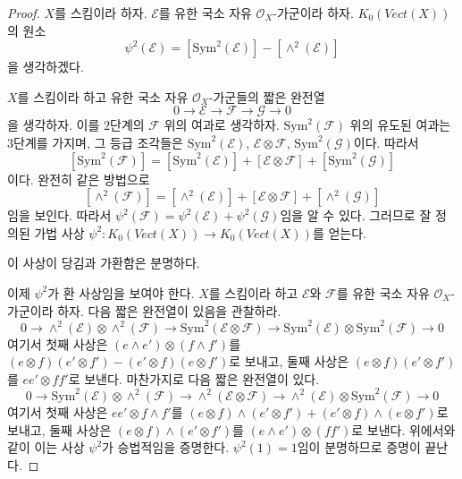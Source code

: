 \begin{proof}
$X$를 스킴이라 하자. $\mathcal{E}$를 유한 국소 자유
$\mathcal{O}_X$-가군이라 하자. $K_0(\textit{Vect}(X))$의 원소
$$
\psi^2(\mathcal{E}) = [\text{Sym}^2(\mathcal{E})] - [\wedge^2(\mathcal{E})]
$$
을 생각하겠다.

\medskip\noindent
$X$를 스킴이라 하고 유한 국소 자유 $\mathcal{O}_X$-가군들의 짧은
완전열
$$
0 \to \mathcal{E} \to \mathcal{F} \to \mathcal{G} \to 0
$$
을 생각하자. 이를 $2$단계의 $\mathcal{F}$ 위의 여과로 생각하자.
$\text{Sym}^2(\mathcal{F})$ 위의 유도된 여과는 $3$단계를 가지며, 그
등급 조각들은 $\text{Sym}^2(\mathcal{E})$,
$\mathcal{E} \otimes \mathcal{F}$,
$\text{Sym}^2(\mathcal{G})$이다. 따라서
$$
[\text{Sym}^2(\mathcal{F})] =
[\text{Sym}^2(\mathcal{E})] +
[\mathcal{E} \otimes \mathcal{F}] +
[\text{Sym}^2(\mathcal{G})]
$$
이다. 완전히 같은 방법으로
$$
[\wedge^2(\mathcal{F})] =
[\wedge^2(\mathcal{E})] +
[\mathcal{E} \otimes \mathcal{F}] +
[\wedge^2(\mathcal{G})]
$$
임을 보인다. 따라서
$\psi^2(\mathcal{F}) = \psi^2(\mathcal{E}) + \psi^2(\mathcal{G})$임을
알 수 있다. 그러므로 잘 정의된 가법 사상
$\psi^2 : K_0(\textit{Vect}(X)) \to K_0(\textit{Vect}(X))$를 얻는다.

\medskip\noindent
이 사상이 당김과 가환함은 분명하다.

\medskip\noindent
이제 $\psi^2$가 환 사상임을 보여야 한다. $X$를 스킴이라 하고
$\mathcal{E}$와 $\mathcal{F}$를 유한 국소 자유
$\mathcal{O}_X$-가군이라 하자. 다음 짧은 완전열이 있음을 관찰하라.
$$
0 \to \wedge^2(\mathcal{E}) \otimes \wedge^2(\mathcal{F}) \to
\text{Sym}^2(\mathcal{E} \otimes \mathcal{F}) \to
\text{Sym}^2(\mathcal{E}) \otimes \text{Sym}^2(\mathcal{F}) \to 0
$$
여기서 첫째 사상은 $(e \wedge e') \otimes (f \wedge f')$를
$(e \otimes f)(e' \otimes f') - (e' \otimes f)(e \otimes f')$로
보내고, 둘째 사상은 $(e \otimes f) (e' \otimes f')$를
$ee' \otimes ff'$로 보낸다. 마찬가지로 다음 짧은 완전열이 있다.
$$
0 \to \text{Sym}^2(\mathcal{E}) \otimes \wedge^2(\mathcal{F}) \to
\wedge^2(\mathcal{E} \otimes \mathcal{F}) \to
\wedge^2(\mathcal{E}) \otimes \text{Sym}^2(\mathcal{F}) \to 0
$$
여기서 첫째 사상은 $e e' \otimes f \wedge f'$를
$(e \otimes f) \wedge (e' \otimes f') + (e' \otimes f) \wedge (e \otimes f')$로
보내고, 둘째 사상은
$(e \otimes f) \wedge (e' \otimes f')$를
$(e \wedge e') \otimes (f f')$로 보낸다. 위에서와 같이 이는 사상
$\psi^2$가 승법적임을 증명한다. $\psi^2(1) = 1$임이 분명하므로
증명이 끝난다.
\end{proof}

